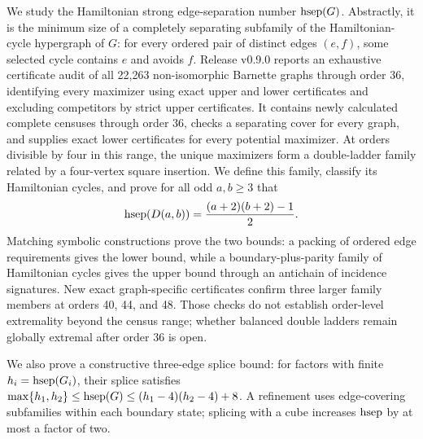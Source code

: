We study the Hamiltonian strong edge-separation number \(\operatorname{hsep}(G)\).
Abstractly, it is the minimum size of a completely separating subfamily of the
Hamiltonian-cycle hypergraph of \(G\): for every ordered pair of distinct edges
\((e,f)\), some selected cycle contains \(e\) and avoids \(f\).  Release v0.9.0
reports an exhaustive certificate audit of all 22,263
non-isomorphic Barnette graphs through order 36, identifying every maximizer
using exact upper and lower certificates and excluding competitors by strict
upper certificates.  It contains newly calculated complete censuses through
order 36, checks a separating cover for every graph, and supplies exact lower
certificates for every potential maximizer.
At orders divisible by four in this range, the unique maximizers
form a double-ladder family related by a four-vertex square insertion.  We
define this family, classify its Hamiltonian cycles, and prove for all odd
\(a,b\ge3\) that
\[
 \operatorname{hsep}(D(a,b))=\frac{(a+2)(b+2)-1}{2}.
\]
Matching symbolic constructions prove the two bounds: a packing of ordered
edge requirements gives the lower bound, while a boundary-plus-parity family
of Hamiltonian cycles gives the upper bound through an antichain of incidence
signatures.  New exact graph-specific certificates confirm three larger family
members at orders 40, 44, and 48.  Those checks do not establish order-level
extremality beyond the census range; whether balanced double ladders remain
globally extremal after order 36 is open.

We also prove a constructive three-edge splice bound: for factors with finite
$h_i=\operatorname{hsep}(G_i)$, their splice satisfies
$\max\{h_1,h_2\}\le\operatorname{hsep}(G)\le(h_1-4)(h_2-4)+8$.
A refinement uses edge-covering subfamilies within each boundary state;
splicing with a cube increases $\operatorname{hsep}$ by at most a factor of two.
